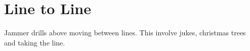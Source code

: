 \section{Line to Line}
Jammer drills above moving between lines.
This involve jukes, christmas trees and taking the line. 
